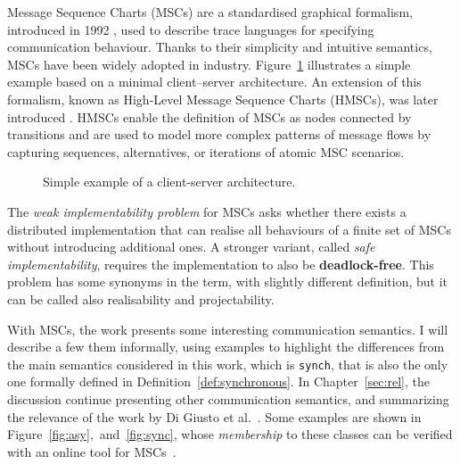 Message Sequence Charts (MSCs) are a standardised graphical formalism,
introduced in 1992 \cite{MSCStandard}, used to describe trace languages 
for specifying communication behaviour. Thanks to their simplicity and 
intuitive semantics, MSCs have been widely adopted in industry.
Figure~\ref{fig:msc-cli-ser} illustrates a simple example based on a
minimal client–server architecture. An extension of this formalism,
known as High-Level Message Sequence Charts (HMSCs), was later
introduced \cite{HMSCStandard}. HMSCs enable the definition of
MSCs as nodes connected by transitions and are used to model more
complex patterns of message flows by capturing sequences, alternatives,
or iterations of atomic MSC scenarios.

\begin{figure}[!ht]
\centering
\begin{msc}[draw frame=none, draw head=none, msc keyword=, head height=0px, label distance=0.5ex, foot height=0px, foot distance=0px]{}

	\nextlevel
\end{msc}
\caption{Simple example of a client-server architecture.}
\label{fig:msc-cli-ser}
\end{figure}

The \emph{weak implementability problem} for MSCs asks whether there 
exists a distributed implementation that can realise all behaviours of a 
finite set of MSCs without introducing additional ones. A stronger variant, 
called \emph{safe implementability}, requires the implementation to also be 
\textbf{deadlock-free}. This problem has some synonyms in the term, with 
slightly different definition, but it can be called also realisability and 
projectability.

With MSCs, the work \cite{di2023partial} presents some interesting communication
semantics. I will describe a few them informally, using examples to
highlight the differences from the main semantics considered in this work,
which is \verb|synch|, that is also the only one formally defined in 
Definition~\ref{def:synchronous}. In Chapter~\ref{sec:rel}, the discussion
continue presenting other communication semantics, and summarizing
the relevance of the work by Di Giusto et al.~\cite{di2023partial}.
Some examples are shown in Figure~\ref{fig:asy},~and~\ref{fig:sync},
whose \emph{membership} to these classes
can be verified with an online tool for MSCs~\cite{MSCTool}. 

